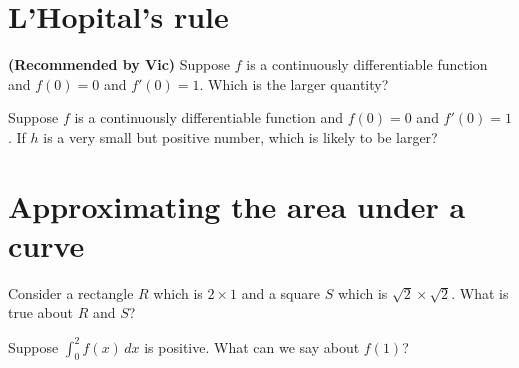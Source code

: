 \documentclass{ximera}
\newcommand{\recommendation}[1]{\textbf{(Recommended by #1)}}
\begin{document}
\clearpage

\section{L'Hopital's rule}

\begin{problem}
\recommendation{Vic}
  Suppose $f$ is a continuously differentiable function and $f(0) = 0$ and $f'(0) = 1$.  Which is the larger quantity?
  \begin{multipleChoice}
  \end{multipleChoice}
\end{problem}

\begin{problem}
  Suppose $f$ is a continuously differentiable function and $f(0) = 0$ and $f'(0) = 1$. If $h$ is a very small but positive number, which is likely to be larger?
  \begin{multipleChoice}
  \end{multipleChoice}
\end{problem}

\clearpage

\section{Approximating the area under a curve}

\begin{problem}
  Consider a rectangle $R$ which is $2 \times 1$ and a square $S$
  which is $\sqrt{2} \times \sqrt{2}$.  What is true about $R$ and
  $S$?
  \begin{multipleChoice}
  \end{multipleChoice}
\end{problem}

\begin{problem}
  Suppose $\int_0^2 f(x) \, dx$ is positive.  What can we say about $f(1)$?
  \begin{multipleChoice}
  \end{multipleChoice}
\end{problem}
\end{document}
